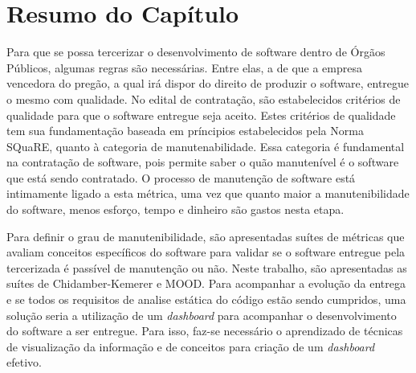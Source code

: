 \section{Resumo do Capítulo}
Para que se possa tercerizar o desenvolvimento de software dentro de Órgãos Públicos, algumas regras são necessárias. Entre elas, a de que a empresa vencedora do pregão, a qual irá dispor do direito de produzir o software, entregue o mesmo com qualidade. No edital de contratação, são estabelecidos critérios de qualidade para que o software entregue seja aceito. Estes critérios de qualidade tem sua fundamentação baseada em príncipios estabelecidos pela Norma SQuaRE, quanto à categoria de manutenabilidade. Essa categoria é fundamental na contratação de software, pois permite saber o quão manutenível é o software que está sendo contratado. O processo de manutenção de software está intimamente ligado a esta métrica, uma vez que quanto maior a manutenibilidade do software, menos esforço, tempo e dinheiro são gastos nesta etapa.

Para definir o grau de manutenibilidade, são apresentadas suítes de métricas que avaliam conceitos específicos do software para validar se o software entregue pela tercerizada é passível de manutenção ou não. Neste trabalho, são apresentadas as suítes de Chidamber-Kemerer e MOOD. Para acompanhar a evolução da entrega e se todos os requisitos de analise estática do código estão sendo cumpridos, uma solução seria a utilização de um \textit{dashboard} para acompanhar o desenvolvimento do software a ser entregue. Para isso, faz-se necessário o aprendizado de técnicas de visualização da informação e de conceitos para criação de um \textit{dashboard} efetivo.